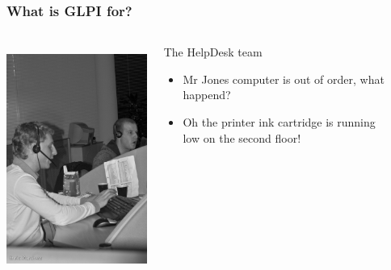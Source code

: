 \documentclass{beamer}
\begin{document}
\begin{frame}
    \frametitle{What is GLPI for?}

 \begin{columns}
 \begin{column}{0.1\textwidth}
         \includegraphics[height=7.5cm]{./pics/helpdesk.jpg}
 \end{column}
 \begin{column}{1\textwidth}

    \begin{block}{The HelpDesk team}
        \begin{itemize}
            \item Mr Jones computer is out of order, what happend?
            \item Oh the printer ink cartridge is running \\
                low on the second floor!
        \end{itemize}
    \end{block}
 \end{column}
\end{columns}


\end{frame}
\end{document}
